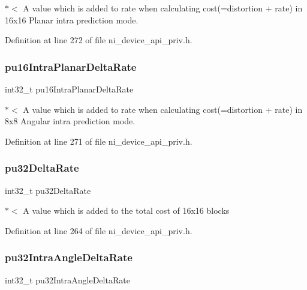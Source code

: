 $\ast$$<$ A value which is added to rate when calculating cost(=distortion + rate) in 16x16 Planar intra prediction mode. 

Definition at line 272 of file ni\+\_\+device\+\_\+api\+\_\+priv.\+h.

\mbox{\label{struct__ni__t408__config__t_a8a6f8bd9f01d7ad5fc1ab680628b9b1f}} 
\subsubsection{\texorpdfstring{pu16IntraPlanarDeltaRate}{pu16IntraPlanarDeltaRate}}
{\footnotesize\ttfamily int32\+\_\+t pu16\+Intra\+Planar\+Delta\+Rate}

$\ast$$<$ A value which is added to rate when calculating cost(=distortion + rate) in 8x8 Angular intra prediction mode. 

Definition at line 271 of file ni\+\_\+device\+\_\+api\+\_\+priv.\+h.

\mbox{\label{struct__ni__t408__config__t_a249307cda533f4b1e8be2b2d42cb702e}} 
\subsubsection{\texorpdfstring{pu32DeltaRate}{pu32DeltaRate}}
{\footnotesize\ttfamily int32\+\_\+t pu32\+Delta\+Rate}

$\ast$$<$ A value which is added to the total cost of 16x16 blocks 

Definition at line 264 of file ni\+\_\+device\+\_\+api\+\_\+priv.\+h.

\mbox{\label{struct__ni__t408__config__t_acc2267a6c7acc757c7fa540cc547a9cb}} 
\subsubsection{\texorpdfstring{pu32IntraAngleDeltaRate}{pu32IntraAngleDeltaRate}}
{\footnotesize\ttfamily int32\+\_\+t pu32\+Intra\+Angle\+Delta\+Rate}

